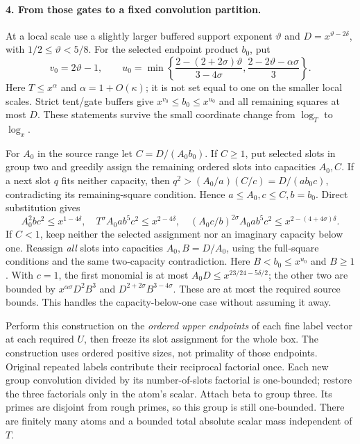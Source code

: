 \paragraph{4. From those gates to a fixed convolution partition.}
At a local scale use a slightly larger buffered support exponent
$\vartheta$ and $D=x^{\vartheta-2\delta}$, with
$1/2\le\vartheta<5/8$. For the selected endpoint product $b_0$, put
\[
 v_0=2\vartheta-1,\qquad
 u_0=\min\left\{\frac{2-(2+2\sigma)\vartheta}{3-4\sigma},
                   \frac{2-2\vartheta-\alpha\sigma}{3}\right\}.
\]
Here $T\le x^\alpha$ and $\alpha=1+O(\kappa)$; it is not set
equal to one on the smaller local scales. Strict tent/gate buffers
give $x^{v_0}\le b_0\le x^{u_0}$ and all remaining squares
at most $D$. These statements survive the small coordinate
change from $\log_T$ to $\log_x$.

For $A_0$ in the source range let $C=D/(A_0b_0)$. If $C\ge1$,
put selected slots in group two and greedily assign the remaining
ordered slots into capacities $A_0,C$. If a next slot $q$ fits
neither capacity, then
$q^2>(A_0/a)(C/c)=D/(ab_0c)$, contradicting its remaining-square
condition. Hence $a\le A_0,c\le C,b=b_0$. Direct substitution gives
\[
 A_0^2bc^2\le x^{1-4\delta},\quad
 T^\sigma A_0ab^5c^2\le x^{2-4\delta},\quad
 (A_0c/b)^{2\sigma}A_0ab^5c^2
       \le x^{2-(4+4\sigma)\delta}.
\]
If $C<1$, keep neither the selected assignment nor an imaginary
capacity below one. Reassign \emph{all} slots into capacities
$A_0,B=D/A_0$, using the full-square conditions and the same
two-capacity contradiction. Here $B<b_0\le x^{u_0}$ and
$B\ge1$. With $c=1$, the first monomial is at most
$A_0D\le x^{23/24-5\delta/2}$; the other two are bounded by
$x^{\alpha\sigma}D^2B^3$ and
$D^{2+2\sigma}B^{3-4\sigma}$. These are at most the required
source bounds. This handles the capacity-below-one case without
assuming it away.

Perform this construction on the \emph{ordered upper endpoints}
of each fine label vector at each required $U$, then freeze its
slot assignment for the whole box. The construction uses ordered
positive sizes, not primality of those endpoints. Original repeated
labels contribute their reciprocal factorial once. Each new group
convolution divided by its number-of-slots factorial is one-bounded;
restore the three factorials only in the atom's scalar. Attach beta
to group three. Its primes are disjoint from rough primes, so this
group is still one-bounded. There are finitely many atoms and a
bounded total absolute scalar mass independent of $T$.

